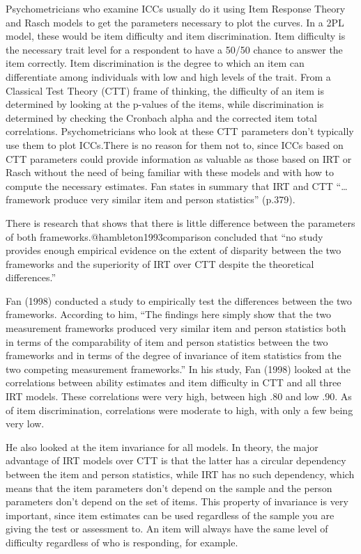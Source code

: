 \documentclass[
  english,
  man]{apa6}
\begin{document}
Psychometricians who examine ICCs usually do it using Item Response Theory and Rasch models to get the parameters necessary to plot the curves. In a 2PL model, these would be item difficulty and item discrimination. Item difficulty is the necessary trait level for a respondent to have a 50/50 chance to answer the item correctly. Item discrimination is the degree to which an item can differentiate among individuals with low and high levels of the trait. From a Classical Test Theory (CTT) frame of thinking, the difficulty of an item is determined by looking at the p-values of the items, while discrimination is determined by checking the Cronbach alpha and the corrected item total correlations. Psychometricians who look at these CTT parameters don't typically use them to plot ICCs.There is no reason for them not to, since ICCs based on CTT parameters could provide information as valuable as those based on IRT or Rasch without the need of being familiar with these models and with how to compute the necessary estimates. Fan states in summary that IRT and CTT ``\ldots{} framework produce very similar item and person statistics'' (p.379).

There is research that shows that there is little difference between the parameters of both frameworks.@hambleton1993comparison concluded that ``no study provides enough empirical evidence on the extent of disparity between the two frameworks and the superiority of IRT over CTT despite the theoretical differences.''

Fan (1998) conducted a study to empirically test the differences between the two frameworks. According to him, ``The findings here simply show that the two measurement frameworks produced very similar item and person statistics both in terms of the comparability of item and person statistics between the two frameworks and in terms of the degree of invariance of item statistics from the two competing measurement frameworks.'' In his study, Fan (1998) looked at the correlations between ability estimates and item difficulty in CTT and all three IRT models. These correlations were very high, between high .80 and low .90. As of item discrimination, correlations were moderate to high, with only a few being very low.

He also looked at the item invariance for all models. In theory, the major advantage of IRT models over CTT is that the latter has a circular dependency between the item and person statistics, while IRT has no such dependency, which means that the item parameters don't depend on the sample and the person parameters don't depend on the set of items. This property of invariance is very important, since item estimates can be used regardless of the sample you are giving the test or assessment to. An item will always have the same level of difficulty regardless of who is responding, for example.
\end{document}
